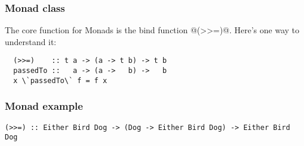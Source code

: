 \documentclass{beamer}
\begin{document}
%
%
%
%
%
%



\begin{frame}

  \frametitle{Monad class}
  The core function for Monads is the bind function @(>>=)@. Here's one way to understand it:

  \begin{lstlisting}
  (>>=)    :: t a -> (a -> t b) -> t b
  passedTo ::   a -> (a ->   b) ->   b
  x \`passedTo\` f = f x
  \end{lstlisting}


\end{frame}



\begin{frame}
  \frametitle{Monad example}

  \begin{lstlisting}[frame=single]
  (>>=) :: Either Bird Dog -> (Dog -> Either Bird Dog) -> Either Bird Dog
  \end{lstlisting}


\end{frame}
\end{document}
